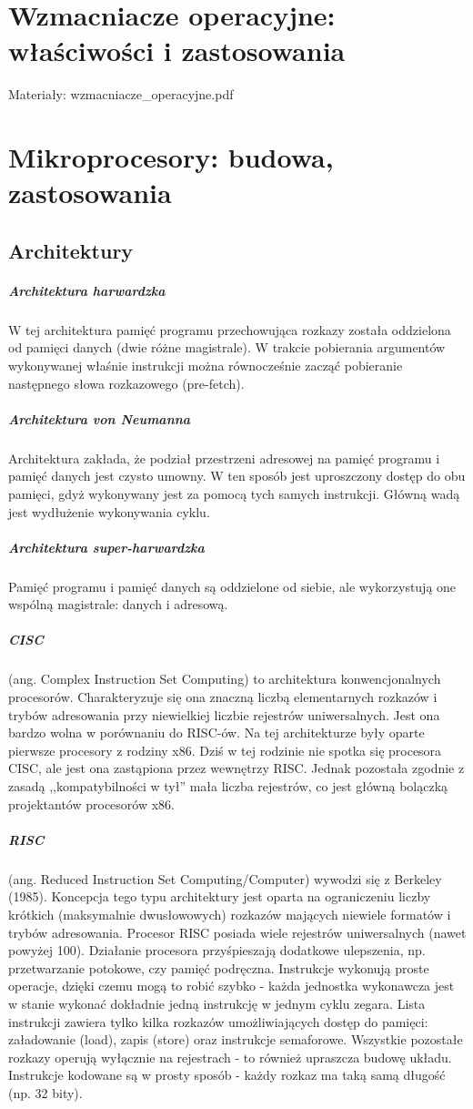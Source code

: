 \documentclass[a4paper,twoside]{report}
\begin{document}
\section{Wzmacniacze operacyjne: właściwości i zastosowania}
Materiały: wzmacniacze\_operacyjne.pdf
\section{Mikroprocesory: budowa, zastosowania}
\subsection{Architektury}
\subparagraph{Architektura harwardzka}
W tej architektura pamięć programu przechowująca rozkazy została oddzielona od pamięci danych (dwie różne magistrale). W trakcie pobierania argumentów wykonywanej właśnie instrukcji można równocześnie zacząć pobieranie następnego słowa rozkazowego (pre-fetch).

\subparagraph{Architektura von Neumanna}
Architektura zakłada, że podział przestrzeni adresowej na pamięć programu i pamięć danych jest czysto umowny. W ten sposób jest uproszczony dostęp do obu pamięci, gdyż wykonywany jest za pomocą tych samych instrukcji. Główną wadą jest wydłużenie wykonywania cyklu.

\subparagraph{Architektura super-harwardzka}
Pamięć programu i pamięć danych są oddzielone od siebie, ale wykorzystują one wspólną magistrale: danych i adresową.

\subparagraph{CISC} (ang. Complex Instruction Set Computing) to architektura konwencjonalnych procesorów. Charakteryzuje się ona znaczną liczbą elementarnych rozkazów i trybów adresowania przy niewielkiej liczbie rejestrów uniwersalnych. Jest ona bardzo wolna w porównaniu do RISC-ów. Na tej architekturze były oparte pierwsze procesory z rodziny x86. Dziś w tej rodzinie nie spotka się procesora CISC, ale jest ona zastąpiona przez wewnętrzy RISC. Jednak pozostała zgodnie z zasadą ,,kompatybilności w tył'' mała liczba rejestrów, co jest główną bolączką projektantów procesorów x86.

\subparagraph{RISC} (ang. Reduced Instruction Set Computing/Computer) wywodzi się z Berkeley (1985). Koncepcja tego typu architektury jest oparta na ograniczeniu liczby krótkich (maksymalnie dwusłowowych) rozkazów mających niewiele formatów i trybów adresowania. Procesor RISC posiada wiele rejestrów uniwersalnych (nawet powyżej 100). Działanie procesora przyśpieszają dodatkowe ulepszenia, np. przetwarzanie potokowe, czy pamięć podręczna. Instrukcje wykonują proste operacje, dzięki czemu mogą to robić szybko - każda jednostka wykonawcza jest w stanie wykonać dokładnie jedną instrukcję w jednym cyklu zegara. Lista instrukcji zawiera tylko kilka rozkazów umożliwiających dostęp do pamięci: załadowanie (load), zapis (store) oraz instrukcje semaforowe. Wszystkie pozostałe rozkazy operują wyłącznie na rejestrach - to również upraszcza budowę układu. Instrukcje kodowane są w prosty sposób - każdy rozkaz ma taką samą długość (np. 32 bity).
\end{document}
